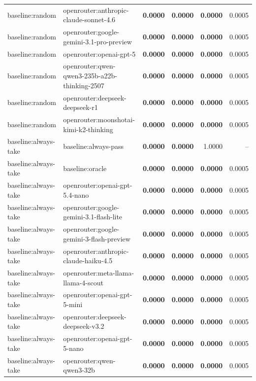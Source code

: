 \begin{table}[t]
\begin{tabular}{llrrrr}
baseline:random & openrouter:anthropic-claude-sonnet-4.6 & \textbf{0.0000} & \textbf{0.0000} & \textbf{0.0000} & 0.0005 \\
baseline:random & openrouter:google-gemini-3.1-pro-preview & \textbf{0.0000} & \textbf{0.0000} & \textbf{0.0000} & 0.0005 \\
baseline:random & openrouter:openai-gpt-5 & \textbf{0.0000} & \textbf{0.0000} & \textbf{0.0000} & 0.0005 \\
baseline:random & openrouter:qwen-qwen3-235b-a22b-thinking-2507 & \textbf{0.0000} & \textbf{0.0000} & \textbf{0.0000} & 0.0005 \\
baseline:random & openrouter:deepseek-deepseek-r1 & \textbf{0.0000} & \textbf{0.0000} & \textbf{0.0000} & 0.0005 \\
baseline:random & openrouter:moonshotai-kimi-k2-thinking & \textbf{0.0000} & \textbf{0.0000} & \textbf{0.0000} & 0.0005 \\
baseline:always-take & baseline:always-pass & \textbf{0.0000} & \textbf{0.0000} & 1.0000 & -- \\
baseline:always-take & baseline:oracle & \textbf{0.0000} & \textbf{0.0000} & \textbf{0.0000} & 0.0005 \\
baseline:always-take & openrouter:openai-gpt-5.4-nano & \textbf{0.0000} & \textbf{0.0000} & \textbf{0.0000} & 0.0005 \\
baseline:always-take & openrouter:google-gemini-3.1-flash-lite & \textbf{0.0000} & \textbf{0.0000} & \textbf{0.0000} & 0.0005 \\
baseline:always-take & openrouter:google-gemini-3-flash-preview & \textbf{0.0000} & \textbf{0.0000} & \textbf{0.0000} & 0.0005 \\
baseline:always-take & openrouter:anthropic-claude-haiku-4.5 & \textbf{0.0000} & \textbf{0.0000} & \textbf{0.0000} & 0.0005 \\
baseline:always-take & openrouter:meta-llama-llama-4-scout & \textbf{0.0000} & \textbf{0.0000} & \textbf{0.0000} & 0.0005 \\
baseline:always-take & openrouter:openai-gpt-5-mini & \textbf{0.0000} & \textbf{0.0000} & \textbf{0.0000} & 0.0005 \\
baseline:always-take & openrouter:deepseek-deepseek-v3.2 & \textbf{0.0000} & \textbf{0.0000} & \textbf{0.0000} & 0.0005 \\
baseline:always-take & openrouter:openai-gpt-5-nano & \textbf{0.0000} & \textbf{0.0000} & \textbf{0.0000} & 0.0005 \\
baseline:always-take & openrouter:qwen-qwen3-32b & \textbf{0.0000} & \textbf{0.0000} & \textbf{0.0000} & 0.0005 \\

\end{tabular}
\end{table}
